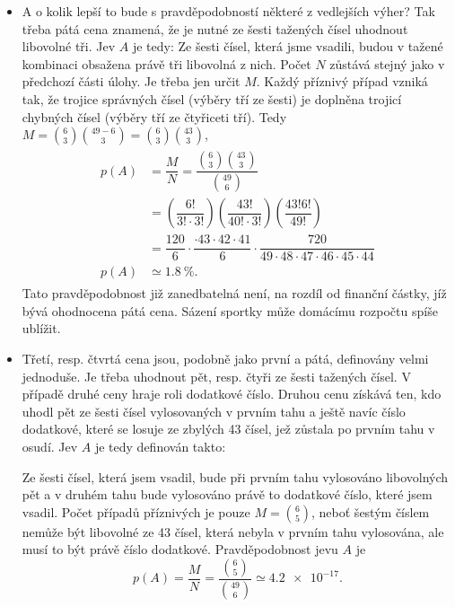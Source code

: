 \begin{mdframed}[style=mdexam]
\begin{example}
\begin{itemize}[leftmargin=10pt,noitemsep]
      \item A o kolik lepší to bude s pravděpodobností některé z vedlejších výher? Tak třeba pátá
            cena znamená, že je nutné ze šesti tažených čísel uhodnout libovolné tři. Jev \(A\) je
            tedy: Ze šesti čísel, která jsme vsadili, budou v tažené kombinaci obsažena právě tři
            libovolná z nich. Počet \(N\) zůstává stejný jako v předchozí části úlohy. Je třeba jen
            určit \(M\). Každý příznivý případ vzniká tak, že trojice správných čísel (výběry tří ze
            šesti) je doplněna trojicí chybných čísel (výběry tří ze čtyřiceti tří). Tedy \(M = 
            \binom{6}{3}\binom{49 - 6}{3} = \binom{6}{3}\binom{43}{3}\),
            \begin{gather*}
              \begin{align*}
              p(A) &= \dfrac{M}{N} 
                    = \dfrac{\binom{6}{3}\binom{43}{3}}{\binom{49}{6}}                           \\              
                   &= \left(\dfrac{6!}{3!\cdot3!}\right)\left(\dfrac{43!}{40!\cdot3!}\right)
                      \left(\dfrac{43!6!}{49!}\right)                                            \\
                   &= \dfrac{120}{6}\cdot\dfrac{\cdot43\cdot42\cdot41}{6}\cdot
				      \dfrac{720}{49\cdot48\cdot47\cdot46\cdot45\cdot44}                                 \\
              p(A) &\simeq\qty{1.8}{\percent}.
              \end{align*}    
            \end{gather*}
            Tato pravděpodobnost již zanedbatelná není, na rozdíl od finanční částky, jíž bývá
            ohodnocena pátá cena. Sázení sportky může domácímu rozpočtu spíše ublížit.
      \item Třetí, resp. čtvrtá cena jsou, podobně jako první a pátá, definovány velmi jednoduše. Je
            třeba uhodnout pět, resp. čtyři ze šesti tažených čísel. V případě druhé ceny hraje roli
            dodatkové číslo. Druhou cenu získává ten, kdo uhodl pět ze šesti čísel vylosovaných v
            prvním tahu a ještě navíc číslo dodatkové, které se losuje ze zbylých \num{43} čísel,
            jež zůstala po prvním tahu v osudí. Jev \(A\) je tedy definován takto:
            
            Ze šesti čísel, která jsem vsadil, bude při prvním tahu vylosováno libovolných pět a v
            druhém tahu bude vylosováno právě to dodatkové číslo, které jsem vsadil. Počet případů
            příznivých je pouze \(M = \binom{6}{5}\), neboť šestým číslem nemůže být libovolné ze
            \num{43} čísel, která nebyla v prvním tahu vylosována, ale musí to být právě číslo
            dodatkové. Pravděpodobnost jevu \(A\) je
            \begin{equation*}
              p(A) = \dfrac{M}{N} = \dfrac{\binom{6}{5}}{\binom{49}{6}} \simeq\num{4.2e-17}.
            \end{equation*}
            

\end{itemize}
\end{example}
\end{mdframed}
